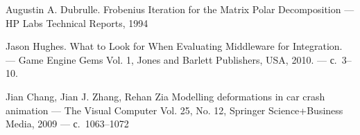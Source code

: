\documentclass[a4paper,11pt]{report}
\begin{document}
\begin{thebibliography}{99}
      Augustin A. Dubrulle.
      \newblock Frobenius Iteration for the Matrix Polar Decomposition
      \newblock --- HP Labs Technical Reports, 1994

      Jason Hughes.
      \newblock What to Look for When Evaluating Middleware for Integration.
      \newblock --- Game Engine Gems Vol. 1, Jones and Barlett Publishers, USA, 2010.
      \newblock --- с.~3--10.

      Jian Chang, Jian J. Zhang, Rehan Zia
      \newblock Modelling deformations in car crash animation
      \newblock --- The Visual Computer Vol. 25, No. 12, Springer Science+Business Media, 2009
      \newblock --- с.~1063--1072

  \end{thebibliography}
\end{document}
